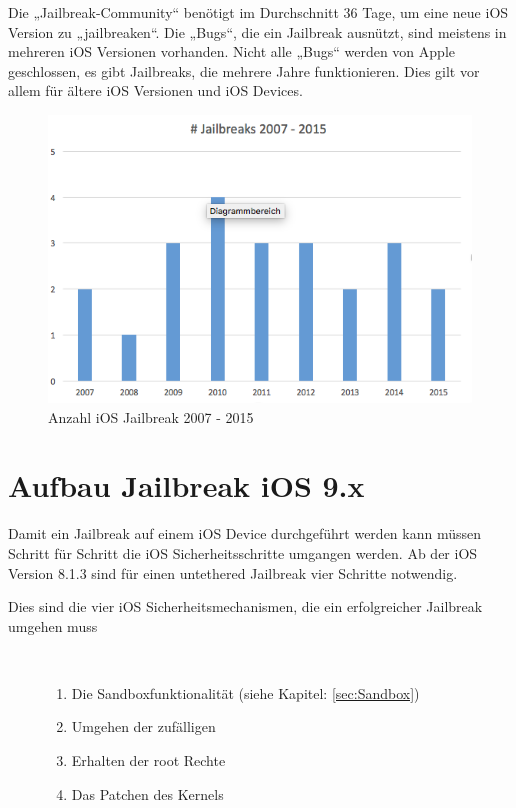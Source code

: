 \newpage
Die „Jailbreak-Community“ benötigt im Durchschnitt 36 Tage, um eine neue iOS Version zu „jailbreaken“. Die „Bugs“, die ein Jailbreak ausnützt, sind meistens in mehreren iOS Versionen vorhanden. Nicht alle „Bugs“ werden von Apple geschlossen, es gibt Jailbreaks, die mehrere Jahre funktionieren. Dies gilt vor allem für ältere iOS Versionen und iOS Devices.

\begin{figure}[!ht]
        \centering
                \includegraphics[scale=0.7]{Bilder/AnzahlJB}
        \caption{Anzahl iOS Jailbreak 2007 - 2015}
        	\label{fig:iOS Jailbreak}
\end{figure}


\section{Aufbau Jailbreak iOS 9.x}
\label{sec:JBAufbau}
Damit ein Jailbreak auf einem iOS Device durchgeführt werden kann müssen Schritt für Schritt die iOS Sicherheitsschritte umgangen werden. Ab der iOS Version 8.1.3 sind für einen \glqq untethered Jailbreak\grqq{} vier Schritte notwendig.

\begin{description}
\item[Dies sind die vier iOS Sicherheitsmechanismen, die ein erfolgreicher Jailbreak umgehen muss]~\par
	\begin{enumerate}
	    \item Die Sandboxfunktionalität (siehe Kapitel: \ref{sec:Sandbox}) 
	     \item Umgehen der zufälligen 
	    \item Erhalten der \glqq root\grqq{} Rechte
	    \item Das Patchen des Kernels
	  \end{enumerate}
\end{description} 

